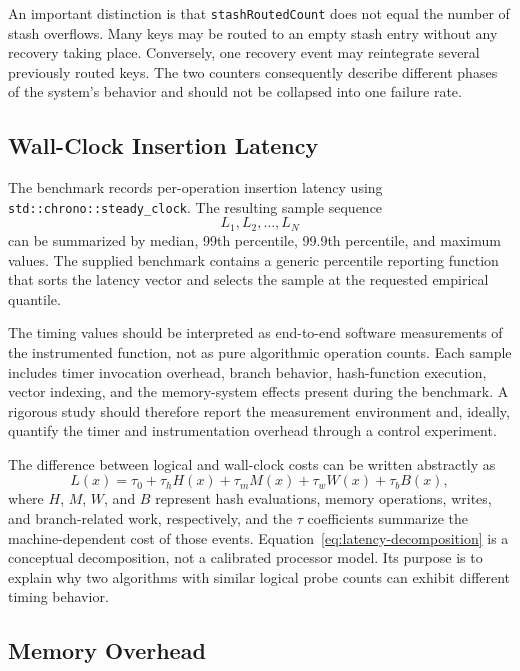 \documentclass[conference]{IEEEtran}
\begin{document}
An important distinction is that \texttt{stashRoutedCount} does not equal the number of stash overflows. Many keys may be routed to an empty stash entry without any recovery taking place. Conversely, one recovery event may reintegrate several previously routed keys. The two counters consequently describe different phases of the system's behavior and should not be collapsed into one failure rate.

\subsection{Wall-Clock Insertion Latency}

The benchmark records per-operation insertion latency using \texttt{std::chrono::steady\_clock}. The resulting sample sequence
\[
    L_1,L_2,\ldots,L_N
\]
can be summarized by median, 99th percentile, 99.9th percentile, and maximum values. The supplied benchmark contains a generic percentile reporting function that sorts the latency vector and selects the sample at the requested empirical quantile.

The timing values should be interpreted as end-to-end software measurements of the instrumented function, not as pure algorithmic operation counts. Each sample includes timer invocation overhead, branch behavior, hash-function execution, vector indexing, and the memory-system effects present during the benchmark. A rigorous study should therefore report the measurement environment and, ideally, quantify the timer and instrumentation overhead through a control experiment.

The difference between logical and wall-clock costs can be written abstractly as
\begin{equation}
    L(x)=\tau_0+\tau_h H(x)+\tau_m M(x)+\tau_w W(x)+\tau_b B(x),
    \label{eq:latency-decomposition}
\end{equation}
where $H$, $M$, $W$, and $B$ represent hash evaluations, memory operations, writes, and branch-related work, respectively, and the $\tau$ coefficients summarize the machine-dependent cost of those events. Equation~\eqref{eq:latency-decomposition} is a conceptual decomposition, not a calibrated processor model. Its purpose is to explain why two algorithms with similar logical probe counts can exhibit different timing behavior.

\subsection{Memory Overhead}
\end{document}
